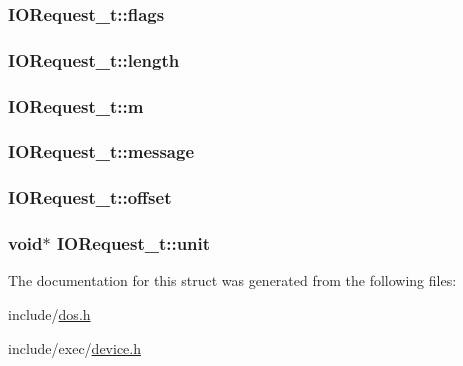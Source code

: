 \hypertarget{structIORequest__t_a920984e3c855b294c6c7fd67b6a229da}{
\subsubsection[{flags}]{ I\+O\+Request\+\_\+t\+::flags}}\label{structIORequest__t_a920984e3c855b294c6c7fd67b6a229da}
\hypertarget{structIORequest__t_a8abb560751ab89ed9832e33ccaf29bbe}{
\subsubsection[{length}]{ I\+O\+Request\+\_\+t\+::length}}\label{structIORequest__t_a8abb560751ab89ed9832e33ccaf29bbe}
\hypertarget{structIORequest__t_a6415480c05aae21f3e52f6a0d69564e0}{
\subsubsection[{m}]{ I\+O\+Request\+\_\+t\+::m}}\label{structIORequest__t_a6415480c05aae21f3e52f6a0d69564e0}
\hypertarget{structIORequest__t_aaf8d00358fa7bdb30c42cc92da2b39ac}{
\subsubsection[{message}]{ I\+O\+Request\+\_\+t\+::message}}\label{structIORequest__t_aaf8d00358fa7bdb30c42cc92da2b39ac}
\hypertarget{structIORequest__t_a6943e0aae82e0b581992229b2ec51db4}{
\subsubsection[{offset}]{ I\+O\+Request\+\_\+t\+::offset}}\label{structIORequest__t_a6943e0aae82e0b581992229b2ec51db4}
\hypertarget{structIORequest__t_a847ff0c9d9b5ddbb2ebe7215283f54b3}{
\subsubsection[{unit}]{\setlength{\rightskip}{0pt plus 5cm}void$\ast$ I\+O\+Request\+\_\+t\+::unit}}\label{structIORequest__t_a847ff0c9d9b5ddbb2ebe7215283f54b3}


The documentation for this struct was generated from the following files\+:\begin{DoxyCompactItemize}
\item 
include/\hyperlink{dos_8h}{dos.\+h}\item 
include/exec/\hyperlink{device_8h}{device.\+h}\end{DoxyCompactItemize}
